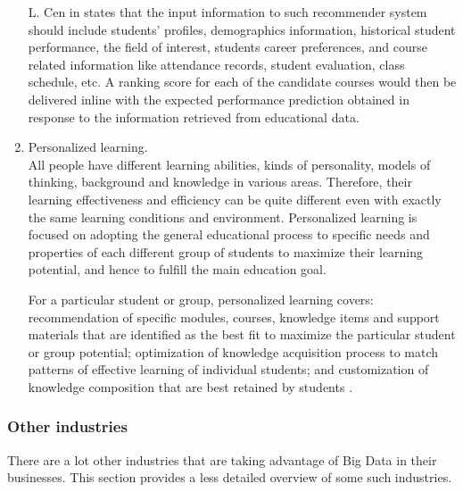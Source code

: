 \documentclass[runningheads]{llncs}
\begin{document}
\begin{enumerate}
L. Cen in \cite{EDUCATIONOPPORTUNITIES} states that the input information to such recommender system should include students’ profiles, demographics information, historical student performance, the field of interest, students career preferences, and course related information like attendance records, student evaluation,
class schedule, etc. A ranking score for each of the candidate courses would then be delivered inline with the expected performance prediction obtained in response to the information retrieved from educational data.\\

\item Personalized learning.\\

All people have different learning abilities, kinds of personality, models of thinking, background and knowledge in various areas. Therefore, their learning effectiveness and efficiency can be quite different even with exactly the same learning conditions and environment. Personalized learning is focused on adopting the general educational process to specific needs and properties of each different group of students to maximize their learning potential, and hence to fulfill the main education goal. 

For a particular student or group, personalized learning covers: recommendation of specific modules, courses, knowledge items and support materials that are identified as the best fit to maximize the particular student or group potential; optimization of knowledge acquisition process to match patterns of effective learning of individual
students; and customization of knowledge composition that are best retained by students \cite{EDUCATIONOPPORTUNITIES}.

\end{enumerate}

\subsubsection{Other industries}

There are a lot other industries that are taking advantage of Big Data in their businesses. This section provides a less detailed overview of some such industries.
\end{document}
